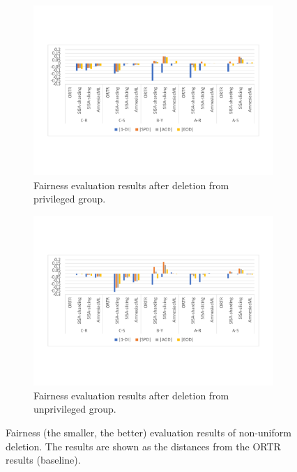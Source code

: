 \begin{figure}[t!]
  \centering
  \begin{subfigure}[b]{0.48\textwidth}
  \centering
  \includegraphics[width=\textwidth]{assets/rq3-fairness-privileged-diff.pdf}
  \caption{Fairness evaluation results after deletion from privileged group.}
  \label{fig:rq3-bar-chart-privileged}
  \end{subfigure}
  \begin{subfigure}[b]{0.48\textwidth}
  \centering
  \includegraphics[width=\textwidth]{assets/rq3-fairness-unprivileged-diff.pdf}
  \caption{Fairness evaluation results after deletion from unprivileged group.}
  \label{fig:rq3-bar-chart-unprivileged}
  \end{subfigure}
  \caption{Fairness (the smaller, the better) evaluation results of non-uniform deletion. The results are shown as the distances from the ORTR results (baseline).}
  \label{fig:rq3-bar-chart}
 \vspace{-5pt}
\end{figure}



